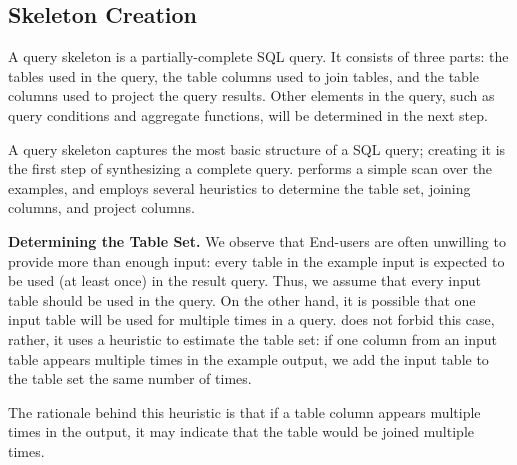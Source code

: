 \subsection{Skeleton Creation}
\label{sec:skeleton}



A query skeleton is a partially-complete SQL query.
It consists of three parts: the tables used in
the query, the table columns used to join tables, and the table
columns used to project the query results.
Other elements in the query, such as query conditions
and aggregate functions, will be determined in
the next step.

A query skeleton captures the most basic structure of
a SQL query; creating it is the first step of synthesizing
a complete query. \ourtool performs a simple scan over
the examples, and employs several heuristics to determine
the table set, joining columns, and project columns.


\vspace{1mm}
{\textbf{Determining the Table Set.}} 
We observe that End-users are often unwilling to provide more than enough
input: every table in the example input
is expected to be used (at least once) in the result query.
Thus, we assume that every input table
should be used in the query. 
On the other hand, it is possible that one input table will be
used for multiple times in a query.
\ourtool does not forbid this case,
rather, it uses a heuristic
to estimate the table set: if one column from
an input table appears multiple times in the
example output, we add the input table to the table set the same
number of times.

The rationale behind this heuristic is that if a table column
appears multiple times in the output, it may indicate that the
table would be joined multiple times.



